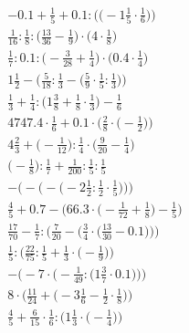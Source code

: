 \documentclass[8pt]{article}
\begin{document}
\begin{align}
-0.1 + \frac{1}{5} + 0.1 : \Big(\big(-1\frac{1}{5} \cdot \frac{1}{6}\big)\Big) \\
\frac{1}{16} : \frac{1}{8} : \big(\frac{13}{36} - \frac{1}{9}\big) \cdot \big(4 \cdot \frac{1}{8}\big) \\
\frac{1}{7} : 0.1 : \big(-\frac{3}{28} + \frac{1}{4}\big) \cdot \big(0.4 \cdot \frac{1}{4}\big) \\
1\frac{1}{2} - \Big(\frac{5}{18} : \frac{1}{3} - \big(\frac{5}{9} \cdot \frac{1}{5} : \frac{1}{3}\big)\Big) \\
\frac{1}{3} + \frac{1}{4} : \big(1\frac{3}{8} + \frac{1}{8} \cdot \frac{1}{3}\big) - \frac{1}{6} \\
4747.4 \cdot \frac{1}{6} + 0.1 \cdot \Big(\frac{2}{8} \cdot \big(-\frac{1}{2}\big)\Big) \\
4\frac{2}{3} + \big(-\frac{1}{12}\big) : \frac{1}{4} \cdot \big(\frac{9}{20} - \frac{1}{4}\big) \\
\big(-\frac{1}{8}\big) : \frac{1}{7} + \frac{1}{200} : \frac{1}{5} : \frac{1}{5} \\
-\bigg(-\Big(-\big(-2\frac{1}{2} : \frac{1}{2} \cdot \frac{1}{5}\big)\Big)\bigg) \\
\frac{4}{5} + 0.7 - \Big(66.3 \cdot \big(-\frac{1}{72} + \frac{1}{8}\big) - \frac{1}{5}\Big) \\
\frac{17}{70} - \frac{1}{7} : \bigg(\frac{7}{20} - \Big(\frac{3}{4} \cdot \big(\frac{13}{30} - 0.1\big)\Big)\bigg) \\
\frac{1}{5} : \Big(\frac{22}{75} : \frac{1}{5} + \frac{1}{3} \cdot \big(-\frac{1}{9}\big)\Big) \\
-\bigg(-7 \cdot \Big(-\frac{1}{49} : \big(1\frac{3}{7} \cdot 0.1\big)\Big)\bigg) \\
8 \cdot \Big(\frac{11}{24} + \big(-3\frac{1}{6} - \frac{1}{2} \cdot \frac{1}{8}\big)\Big) \\
\frac{4}{5} + \frac{6}{15} \cdot \frac{1}{6} : \Big(1\frac{1}{3} \cdot \big(-\frac{1}{4}\big)\Big)
\end{align}
\end{document}

